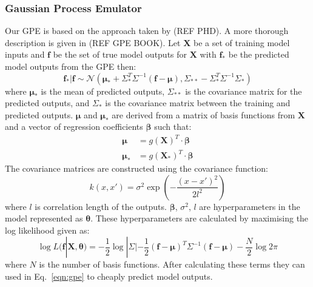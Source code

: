 \documentclass[12pt,a4paper]{article}
\begin{document}
\subsubsection{Gaussian Process Emulator}
\noindent
Our GPE is based on the approach taken by (REF PHD). A more thorough description is given in (REF GPE BOOK). Let $\bm{X}$ be a set of training model inputs and $\bm{f}$ be the set of true model outputs for $\bm{X}$ with $\bm{f}_*$ be the predicted model outputs from the GPE then:
\begin{equation}\label{eqn:gpe}
	\bm{f_*}|\bm{f}\sim \mathcal{N}(\bm{\mu}_* + \Sigma_*^T\Sigma^{-1}(\bm{f}-\bm{\mu}),
	\Sigma_{**}-\Sigma_*^T\Sigma^{-1}\Sigma_*)
\end{equation}
where $\bm{\mu}_*$ is the mean of predicted outputs, $\Sigma_{**}$ is the covariance matrix for the predicted outputs, and $\Sigma_*$ is the covariance matrix between the training and predicted outputs. $\bm{\mu}$ and $\bm{\mu}_*$ are derived from a matrix of basis functions from $\bm{X}$ and a vector of regression coefficients $\bm{\beta}$ such that:
\begin{align}\label{eqn:mew}
	\bm{\mu} &= g(\bm{X})^T\cdot \bm{\beta} \\
	\bm{\mu}_* &= g(\bm{X}_*)^T\cdot \bm{\beta}
\end{align}
The covariance matrices are constructed using the covariance function:
\begin{equation}
	k(x,x')=\sigma^2\exp\left( -\frac{(x-x')^2}{2l^2}\right)
\end{equation}
where $l$ is correlation length of the outputs. $\bm{\beta}$, $\sigma^2$, $l$ are hyperparameters in the model represented as $\bm{\theta}$. These hyperparameters are calculated by maximising the log likelihood given as:
\begin{equation}
	\log L(\bm{f}|\bm{X},\bm{\theta})=-\frac{1}{2}\log|\Sigma|-\frac{1}{2}(\bm{f}-\bm{\mu})^T
	\Sigma^{-1}(\bm{f}-\bm{\mu})-\frac{N}{2}\log2\pi
\end{equation}
where $N$ is the number of basis functions. After calculating these terms they can used in Eq.~\eqref{eqn:gpe} to cheaply predict model outputs.
\end{document}

